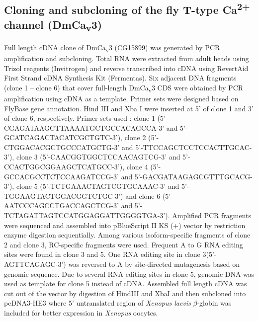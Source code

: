 \subsection*{Cloning and subcloning of the fly T-type Ca\textsuperscript{2+} channel (DmCa\textsubscript{v}3)}

Full length cDNA clone of DmCa\textsubscript{v}3 (CG15899) was generated by PCR amplification and subcloning.
Total RNA were extracted from adult heads using Trizol reagents (Invitrogen) and reverse transcribed into cDNA using RevertAid First Strand cDNA Synthesis Kit (Fermentas).
Six adjacent DNA fragments (clone 1 – clone 6) that cover full-length DmCa\textsubscript{v}3 CDS were obtained by PCR amplification using cDNA as a template. 
Primer sets were designed based on FlyBase gene annotation. 
Hind III and Xba I were inserted at 5' of clone 1 and 3' of clone 6, respectively.
Primer sets used : clone 1 (5'-CGAGATAAGCTTAAAATGCTGCCACAGCCA-3' and 5'-GCATCAGACTACATCGCTGTC-3'), clone 2 (5'-CTGGACACGCTGCCCATGCTG-3' and 5'-TTCCAGCTCCTCCACTTGCAC-3'), clone 3 (5'-CAACGGTGGCTCCAACAGTCG-3' and 5'-CCACTGGCGGAAGCTCATGCC-3'), clone 4 (5'-GCCACGCCTCTCCAAGATCCG-3' and 5'-GACGATAAGAGCGTTTGCACG-3'), clone 5 (5'-TCTGAAACTAGTCGTGCAAAC-3' and 5'-TGGAAGTACTGGACGGTCTGC-3') and clone 6 (5'-AATCCCAGCCTGACCAGCTCG-3' and 5'-TCTAGATTAGTCCATGGAGGATTGGGGTGA-3').
Amplified PCR fragments were sequenced and assembled into pBlueScript II KS (+) vector by restriction enzyme digestion sequentially.
Among various isoform-specific fragments of clone 2 and clone 3, RC-specific fragments were used.
Frequent A to G RNA editing sites were found in clone 3 and 5.
One RNA editing site in clone 3(5'-AGTTCAGAGC-3') was reversed to A by site-directed mutagenesis based on genomic sequence.
Due to several RNA editing sites in clone 5, genomic DNA was used as template for clone 5 instead of cDNA.
Assembled full length cDNA was cut out of the vector by digestion of HindIII and XbaI and then subcloned into pcDNA3-HE3 where 5' untranslated region of \emph{Xenopus laevis} $\beta$-globin was included for better expression in \emph{Xenopus} oocytes.
    
  
  